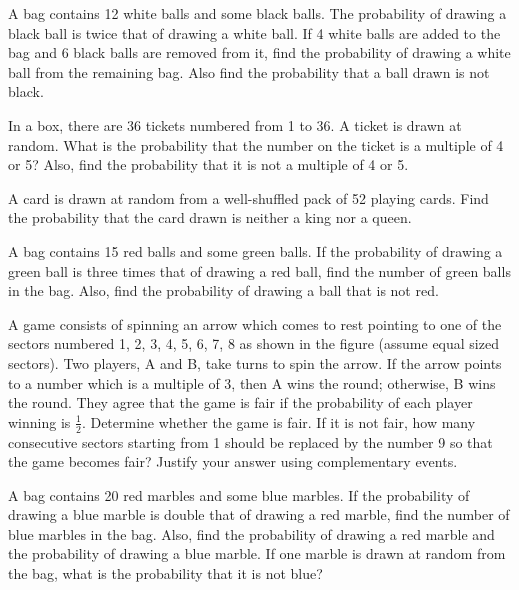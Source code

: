 \documentclass[12pt,a4paper]{exam}
\begin{document}
\begin{questions}
\question[5] A bag contains 12 white balls and some black balls. The probability of drawing a black ball is twice that of drawing a white ball. If 4 white balls are added to the bag and 6 black balls are removed from it, find the probability of drawing a white ball from the remaining bag. Also find the probability that a ball drawn is not black.
\vspace{0.15cm}

\question[5] In a box, there are 36 tickets numbered from 1 to 36. A ticket is drawn at random. What is the probability that the number on the ticket is a multiple of 4 or 5? Also, find the probability that it is not a multiple of 4 or 5.
\vspace{0.15cm}

\question[5] A card is drawn at random from a well-shuffled pack of 52 playing cards. Find the probability that the card drawn is neither a king nor a queen.
\vspace{0.15cm}

\question[5] A bag contains 15 red balls and some green balls. If the probability of drawing a green ball is three times that of drawing a red ball, find the number of green balls in the bag. Also, find the probability of drawing a ball that is not red.
\vspace{0.15cm}

\question[5] A game consists of spinning an arrow which comes to rest pointing to one of the sectors numbered 1, 2, 3, 4, 5, 6, 7, 8 as shown in the figure (assume equal sized sectors). Two players, A and B, take turns to spin the arrow. If the arrow points to a number which is a multiple of 3, then A wins the round; otherwise, B wins the round. They agree that the game is fair if the probability of each player winning is $\frac{1}{2}$. Determine whether the game is fair. If it is not fair, how many consecutive sectors starting from 1 should be replaced by the number 9 so that the game becomes fair? Justify your answer using complementary events.
\vspace{0.15cm}

\question[5] A bag contains 20 red marbles and some blue marbles. If the probability of drawing a blue marble is double that of drawing a red marble, find the number of blue marbles in the bag. Also, find the probability of drawing a red marble and the probability of drawing a blue marble. If one marble is drawn at random from the bag, what is the probability that it is not blue?
\vspace{0.15cm}


\end{questions}
\end{document}
